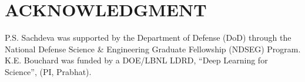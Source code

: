 \documentclass[letterpaper, 10 pt, conference]{ieeeconf}  %
\begin{document}




\section*{ACKNOWLEDGMENT}

P.S. Sachdeva was supported by the Department of Defense (DoD) through the National Defense Science \& Engineering Graduate Fellowship (NDSEG) Program. K.E. Bouchard was funded by a DOE/LBNL LDRD, ``Deep Learning for Science'', (PI, Prabhat).


\end{document}
